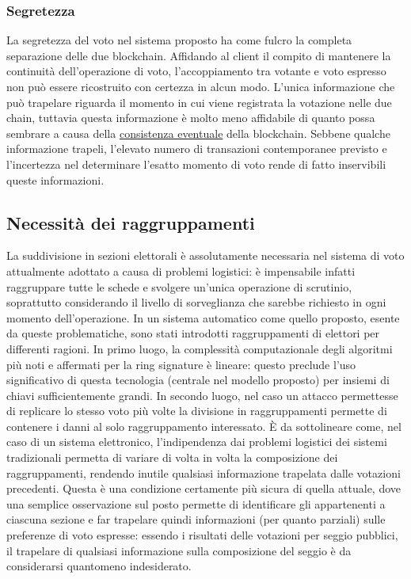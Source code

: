 		\subsubsection{Segretezza}
			La segretezza del voto nel sistema proposto ha come fulcro la completa separazione delle due blockchain. Affidando al client il compito di mantenere la continuità dell'operazione di voto, l'accoppiamento tra votante e voto espresso non può essere ricostruito con certezza in alcun modo. L'unica informazione che può trapelare riguarda il momento in cui viene registrata la votazione nelle due chain, tuttavia questa informazione è molto meno affidabile di quanto possa sembrare a causa della \href{sec:teorema_CAP}{consistenza eventuale} della blockchain. Sebbene qualche informazione trapeli, l'elevato numero di transazioni contemporanee previsto e l'incertezza nel determinare l'esatto momento di voto rende di fatto inservibili queste informazioni.
	
	
	\subsection{Necessità dei raggruppamenti}
		La suddivisione in sezioni elettorali è assolutamente necessaria nel sistema di voto attualmente adottato a causa di problemi logistici: è impensabile infatti raggruppare tutte le schede e svolgere un'unica operazione di scrutinio, soprattutto considerando il livello di sorveglianza che sarebbe richiesto in ogni momento dell'operazione. In un sistema automatico come quello proposto, esente da queste problematiche, sono stati introdotti raggruppamenti di elettori per differenti ragioni. In primo luogo, la complessità computazionale degli algoritmi più noti e affermati per la ring signature è lineare: questo preclude l'uso significativo di questa tecnologia (centrale nel modello proposto) per insiemi di chiavi sufficientemente grandi. In secondo luogo, nel caso un attacco permettesse di replicare lo stesso voto più volte la divisione in raggruppamenti permette di contenere i danni al solo raggruppamento interessato.
		È da sottolineare come, nel caso di un sistema elettronico, l'indipendenza dai problemi logistici dei sistemi tradizionali permetta di variare di volta in volta la composizione dei raggruppamenti, rendendo inutile qualsiasi informazione trapelata dalle votazioni precedenti. Questa è una condizione certamente più sicura di quella attuale, dove una semplice osservazione sul posto permette di identificare gli appartenenti a ciascuna sezione e far trapelare quindi informazioni (per quanto parziali) sulle preferenze di voto espresse: essendo i risultati delle votazioni per seggio pubblici, il trapelare di qualsiasi informazione sulla composizione del seggio è da considerarsi quantomeno indesiderato.
	
